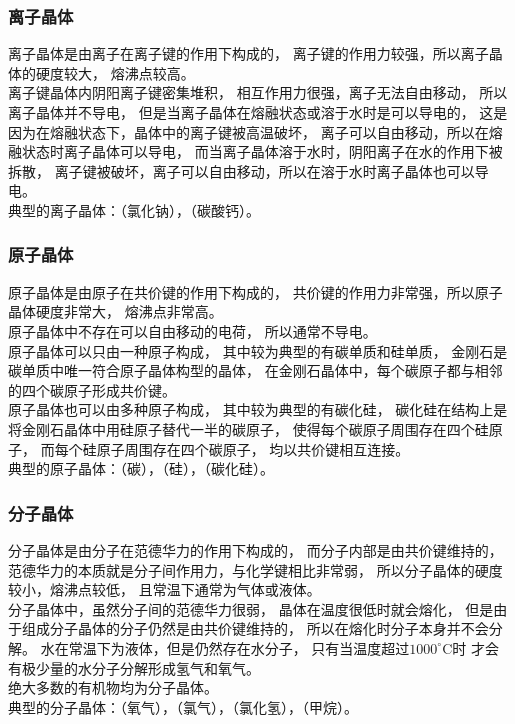 \documentclass[UTF8]{ctexart}
\begin{document}
\subsubsection{离子晶体}
    离子晶体是由离子在离子键的作用下构成的，
    离子键的作用力较强，所以离子晶体的硬度较大，
    熔沸点较高。\\[3mm]
    离子键晶体内阴阳离子键密集堆积，
    相互作用力很强，离子无法自由移动，
    所以离子晶体并不导电，
    但是当离子晶体在熔融状态或溶于水时是可以导电的，
    这是因为在熔融状态下，晶体中的离子键被高温破坏，
    离子可以自由移动，所以在熔融状态时离子晶体可以导电，
    而当离子晶体溶于水时，阴阳离子在水的作用下被拆散，
    离子键被破坏，离子可以自由移动，所以在溶于水时离子晶体也可以导电。\\[3mm]
    典型的离子晶体：（氯化钠），（碳酸钙）。

\subsubsection{原子晶体}
    原子晶体是由原子在共价键的作用下构成的，
    共价键的作用力非常强，所以原子晶体硬度非常大，
    熔沸点非常高。\\[3mm]
    原子晶体中不存在可以自由移动的电荷，
    所以通常不导电。\\[3mm]
    原子晶体可以只由一种原子构成，
    其中较为典型的有碳单质和硅单质，
    金刚石是碳单质中唯一符合原子晶体构型的晶体，
    在金刚石晶体中，每个碳原子都与相邻的四个碳原子形成共价键。\\[3mm]
    原子晶体也可以由多种原子构成，
    其中较为典型的有碳化硅，
    碳化硅在结构上是将金刚石晶体中用硅原子替代一半的碳原子，
    使得每个碳原子周围存在四个硅原子，
    而每个硅原子周围存在四个碳原子，
    均以共价键相互连接。\\[3mm]
    典型的原子晶体：（碳），（硅），（碳化硅）。

\subsubsection{分子晶体}
    分子晶体是由分子在范德华力的作用下构成的，
    而分子内部是由共价键维持的，
    范德华力的本质就是分子间作用力，与化学键相比非常弱，
    所以分子晶体的硬度较小，熔沸点较低，
    且常温下通常为气体或液体。\\[3mm]
    分子晶体中，虽然分子间的范德华力很弱，
    晶体在温度很低时就会熔化，
    但是由于组成分子晶体的分子仍然是由共价键维持的，
    所以在熔化时分子本身并不会分解。
    水在常温下为液体，但是仍然存在水分子，
    只有当温度超过$1000^{\circ}\text{C}$时
    才会有极少量的水分子分解形成氢气和氧气。\\[3mm]
    绝大多数的有机物均为分子晶体。\\[3mm]
    典型的分子晶体：（氧气），（氯气），（氯化氢），（甲烷）。
\end{document}
